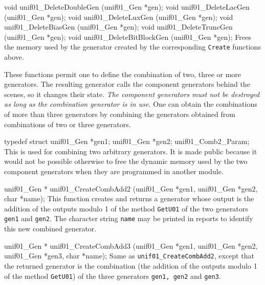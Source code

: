 void unif01_DeleteDoubleGen (unif01_Gen *gen);
void unif01_DeleteLacGen    (unif01_Gen *gen);
void unif01_DeleteLuxGen    (unif01_Gen *gen);
void unif01_DeleteBiasGen   (unif01_Gen *gen);
void unif01_DeleteTruncGen  (unif01_Gen *gen);
void unif01_DeleteBitBlockGen (unif01_Gen *gen);
\endcode
 \tab Frees the memory used by the generator created by the corresponding
 {\tt Create} functions above.
 \endtab




These functions permit one to define the combination of two, three
or more generators. The resulting generator calls
%
the component generators behind the scenes, so it changes their
state. \emph{The  component generators must not be destroyed as long as the
 combination generator is in use.}
One can obtain the combinations of more than three generators by combining
the generators obtained from combinations of two or three generators.
%
\hide
\code

typedef struct {
   unif01_Gen *gen1;
   unif01_Gen *gen2;
} unif01_Comb2_Param;
\endcode
 \tab This is used for combining two arbitrary generators. It is made
  public because it would not be possible otherwise to free the dynamic
  memory used by the two component generators when they are programmed
  in another module.
  \endtab
\endhide
\code


unif01_Gen * unif01_CreateCombAdd2 (unif01_Gen *gen1, unif01_Gen *gen2,
                                    char *name);
\endcode
 \tab  This function creates and returns a generator whose output is the
 addition of the outputs modulo 1 of the  method {\tt GetU01} of the
 two generators {\tt gen1} and {\tt gen2}.
 The character string {\tt name} may be printed in reports to identify this
 new combined  generator.
 \endtab
\code


unif01_Gen * unif01_CreateCombAdd3 (unif01_Gen *gen1, unif01_Gen *gen2,
                                    unif01_Gen *gen3, char *name);
\endcode
 \tab  Same as {\tt unif01\_CreateCombAdd2}, except that the returned
  generator is the combination (the addition of the outputs modulo 1 of the
  method {\tt GetU01}) of the three generators {\tt gen1, gen2} and {\tt gen3}.
 \endtab
\code


